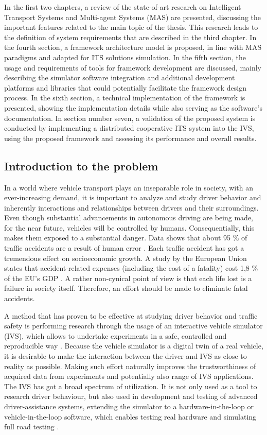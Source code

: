 \documentclass[titlepage, 12pt]{article}
\begin{document}
In the first two chapters, a review of the state-of-art research on Intelligent Transport
Systems and Multi-agent Systems (MAS) are presented, discussing the important features related
to the main topic of the thesis. This research leads to the definition of system requirements
that are described in the third chapter. In the fourth section, a framework architecture model
is proposed, in line with MAS paradigms and adapted for ITS solutions simulation. In the fifth
section, the usage and requirements of tools for framework development are discussed, mainly
describing the simulator software integration and additional development platforms and
libraries that could potentially facilitate the framework design process. In the sixth section,
a technical implementation of the framework is presented, showing the implementation details
while also serving as the software's documentation. In section number seven, a validation of
the proposed system is conducted by implementing a distributed cooperative ITS system into the
IVS, using the proposed framework and assessing its performance and overall results.

\subsection{Introduction to the problem}

In a world where vehicle transport plays an inseparable role in society, with an ever-increasing
demand, it is important to analyze and study driver behavior and inherently interactions and
relationships between drivers and their surroundings. Even though
substantial advancements in autonomous driving are being made, for the near future, vehicles 
will be controlled by humans. Consequentially, this makes them exposed to a substantial danger. 
Data shows that about 95 \% of traffic accidents are a result of human error \cite{Parliament2021}. 
Each traffic accident has got a tremendous effect on socioeconomic growth. A study by the European
Union states that accident-related expenses (including the cost of a fatality) cost 1,8 \% of the EU's GDP \cite{Wijnen2017}.  
A rather non-cynical point of view is that each life lost is a failure in society itself.
Therefore, an effort should be made to eliminate fatal accidents.

A method that has proven to be effective at studying driver behavior and traffic safety is 
performing research through the usage of an interactive vehicle simulator (IVS), which allows to undertake experiments in a safe,
controlled and reproducible way \cite{Winter2012}. Because the vehicle simulator is a digital
twin of a real vehicle, it is desirable to make the interaction between the driver
and IVS as close to reality as possible. Making such effort naturally improves the trustworthiness of
acquired data from experiments and potentially also range of IVS applications. The IVS has
got a broad spectrum of utilization. It is not only used as a tool to research driver
behaviour, but also used in development and testing of advanced driver-assistance systems,
extending the simulator to a hardware-in-the-loop or vehicle-in-the-loop software, which
enables testing real hardware and simulating full road testing \cite{Horvath2019}.
\end{document}
